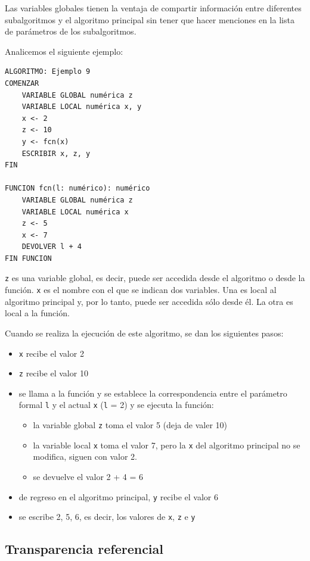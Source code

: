 \documentclass[]{book}
\providecommand{\tightlist}{%
  \setlength{\itemsep}{0pt}\setlength{\parskip}{0pt}}
\begin{document}
Las variables globales tienen la ventaja de compartir información entre
diferentes subalgoritmos y el algoritmo principal sin tener que hacer
menciones en la lista de parámetros de los subalgoritmos.

Analicemos el siguiente ejemplo:

\begin{verbatim}
ALGORITMO: Ejemplo 9
COMENZAR
    VARIABLE GLOBAL numérica z
    VARIABLE LOCAL numérica x, y
    x <- 2
    z <- 10
    y <- fcn(x)
    ESCRIBIR x, z, y
FIN

FUNCION fcn(l: numérico): numérico
    VARIABLE GLOBAL numérica z
    VARIABLE LOCAL numérica x
    z <- 5
    x <- 7
    DEVOLVER l + 4
FIN FUNCION
\end{verbatim}

\texttt{z} es una variable global, es decir, puede ser accedida desde el
algoritmo o desde la función. \texttt{x} es el nombre con el que se
indican dos variables. Una es local al algoritmo principal y, por lo
tanto, puede ser accedida sólo desde él. La otra es local a la función.

Cuando se realiza la ejecución de este algoritmo, se dan los siguientes
pasos:

\begin{itemize}
\item
  \texttt{x} recibe el valor 2
\item
  \texttt{z} recibe el valor 10
\item
  se llama a la función y se establece la correspondencia entre el
  parámetro formal \texttt{l} y el actual \texttt{x} (\texttt{l} = 2) y
  se ejecuta la función:

  \begin{itemize}
  \tightlist
  \item
    la variable global \texttt{z} toma el valor 5 (deja de valer 10)
  \item
    la variable local \texttt{x} toma el valor 7, pero la \texttt{x} del
    algoritmo principal no se modifica, siguen con valor 2.
  \item
    se devuelve el valor 2 + 4 = 6
  \end{itemize}
\item
  de regreso en el algoritmo principal, \texttt{y} recibe el valor 6
\item
  se escribe 2, 5, 6, es decir, los valores de \texttt{x}, \texttt{z} e
  \texttt{y}
\end{itemize}

\subsection{Transparencia referencial}\label{transparencia-referencial}
\end{document}

